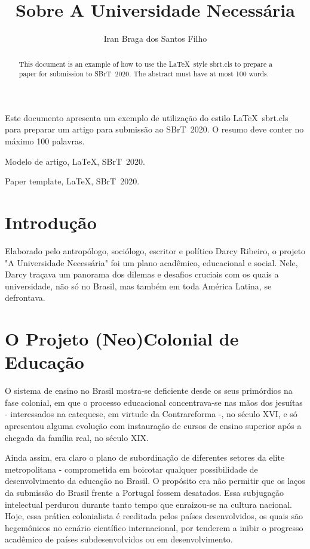 \documentclass{sbrt}
\begin{document}
\title{Sobre A Universidade Necessária}

\author{Iran Braga dos Santos Filho}

\maketitle

\begin{resumo}
Este documento apresenta um exemplo de utilização do estilo \LaTeX\ sbrt.cls para preparar um artigo para submissão ao SBrT~2020. O resumo deve conter no máximo 100 palavras.
\end{resumo}
\begin{chave}
Modelo de artigo, \LaTeX, SBrT~2020.
\end{chave}

\begin{abstract}
This document is an example of how to use the \LaTeX\ style sbrt.cls to prepare a paper for submission to SBrT~2020. The abstract must have at most 100 words.
\end{abstract}
\begin{keywords}
Paper template, \LaTeX, SBrT~2020.
\end{keywords}

\section{Introdução}

Elaborado pelo antropólogo, sociólogo, escritor e político Darcy Ribeiro, o projeto "A Universidade Necessária"{} foi um plano acadêmico, educacional e social. Nele, Darcy traçava um panorama dos dilemas e desafios cruciais com os quais a universidade, não só no Brasil, mas também em toda América Latina, se defrontava.

\section{O Projeto (Neo)Colonial de Educação}

O sistema de ensino no Brasil mostra-se deficiente desde os seus primórdios na fase colonial, em que o processo educacional concentrava-se nas mãos dos jesuítas - interessados na catequese, em virtude da Contrareforma -, no século XVI, e só apresentou alguma evolução com instauração de cursos de ensino superior após a chegada da família real, no século XIX.

Ainda assim, era claro o plano de subordinação de diferentes setores da elite metropolitana - comprometida em boicotar qualquer possibilidade de desenvolvimento da educação no Brasil. O propósito era não permitir que os laços da submissão do Brasil frente a Portugal fossem desatados. Essa subjugação intelectual perdurou durante tanto tempo que enraizou-se na cultura nacional. Hoje, essa prática colonialista é reeditada pelos países desenvolvidos, os quais são hegemônicos no cenário científico internacional, por tenderem a inibir o progresso acadêmico de países subdesenvolvidos ou em desenvolvimento.
\end{document}
